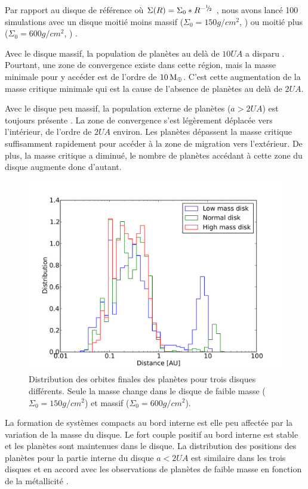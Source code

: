 Par rapport au disque de référence où $\Sigma(R) = \Sigma_0 * R^{-{{}^{1\!\!}/ _{\!2}}}$ , nous avons lancé 100
simulations avec un disque moitié moins massif ($\Sigma_0=150\unit{g/cm^2}$, ) ou moitié plus
($\Sigma_0=600\unit{g/cm^2}$, ) .

Avec le disque massif, la population de planètes au delà de $10\unit{UA}$ a disparu . Pourtant, une zone de convergence existe dans cette région, mais la masse minimale pour y accéder est de l'ordre de $10\mathrm{\thinspace M_\oplus}$. C'est cette augmentation de la masse critique minimale qui est la cause de l'absence de planètes au delà de $2\unit{UA}$.

Avec le disque peu massif, la population externe de planètes ($a>2\unit{UA}$) est toujours présente . La zone de convergence s'est légèrement déplacée vers l'intérieur, de l'ordre de $2\unit{UA}$ environ. Les planètes dépassent la masse critique suffisamment rapidement pour accéder à la zone de migration vers l'extérieur. De plus, la masse critique a diminué, le nombre de planètes accédant à cette zone du disque augmente donc d'autant.

\begin{figure}[htbp]
\centering
\includegraphics[width=0.8\linewidth]{figure/HSE/hist_a_disk.pdf}
\caption{Distribution des orbites finales des planètes pour trois disques différents. Seule la masse change dans le disque de faible masse ($\Sigma_0=150\unit{g/cm^2}$) et massif ($\Sigma_0=600\unit{g/cm^2}$).}\label{fig:HSE_hist_a_disk}
\end{figure}

La formation de systèmes compacts au bord interne est elle peu affectée par la variation de la masse du disque. Le fort couple
positif au bord interne est stable et les planètes sont maintenues dans le disque. La distribution des positions des planètes
pour la partie interne du disque $a<2\unit{UA}$ est similaire dans les trois disques et en accord avec les observations de
planètes de faible masse en fonction de la métallicité \citep{ghezzi2010stellar, buchhave2012abundance}. 

